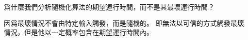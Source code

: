 \startEXERCISE
爲什麼我們分析隨機化算法的期望運行時間，而不是其最壞運行時間？
\stopEXERCISE

\startANSWER
因爲最壞情況不會由特定輸入觸發，而是隨機的。
即無法以可信的方式觸發最壞情況，但是他以一定概率包含在期望運行時間內。
\stopANSWER
